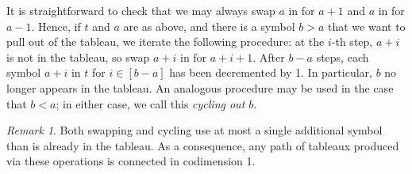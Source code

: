 \documentclass[11pt,reqno]{amsart}
\theoremstyle{definition}
\theoremstyle{problem}
\theoremstyle{plain}
\theoremstyle{remark}
\newtheorem{remark}[definition]{Remark}
\theoremstyle{theorem}
\numberwithin{equation}{section}
\numberwithin{figure}{section}
\theoremstyle{definition}
\theoremstyle{problem}
\theoremstyle{plain}
\begin{document}
It is straightforward to check that we may always swap $a$ in for
$a+1$ and $a$ in for $a-1$.  Hence, if $t$ and $a$ are as above, and
there is a symbol $b > a$ that we want to pull out of the tableau, we
iterate the following procedure: at the $i$-th step, $a+i$ is not in
the tableau, so swap $a+i$ in for $a+i+1$.  After $b-a$ steps, each
symbol $a+i$ in $t$ for $i \in [b-a]$ has been decremented by 1.  In
particular, $b$ no longer appears in the tableau.  An analogous
procedure may be used in the case that $b < a$; in either case, we
call this \textit{cycling out $b$}.

\begin{remark}
Both swapping and  cycling  use at most a single additional symbol than is already in the tableau.  As a consequence,
any path of tableaux produced via these operations is connected in codimension 1.
\end{remark}
\end{document}
